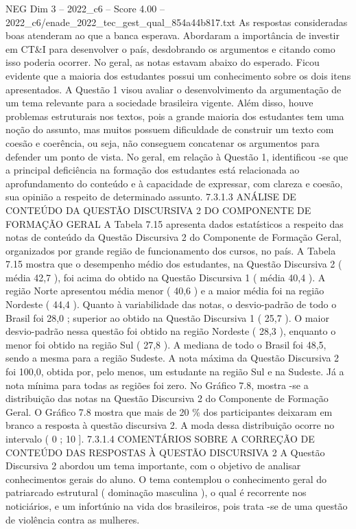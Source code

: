 \begin{textsample}{NEG Dim 3 – 2022\_c6 – Score 4.00 – 2022\_c6/enade\_2022\_tec\_gest\_qual\_854a44b817.txt}
As respostas consideradas boas atenderam ao que a banca esperava.
Abordaram a importância de investir em CT\&I para desenvolver o país, desdobrando os argumentos e citando como isso poderia ocorrer.
No geral, as notas estavam abaixo do esperado.
Ficou evidente que a maioria dos estudantes possui um conhecimento sobre os dois itens apresentados.
A Questão 1 visou avaliar o desenvolvimento da argumentação de um tema relevante para a sociedade brasileira vigente.
Além disso, houve problemas estruturais nos textos, pois a grande maioria dos estudantes tem uma noção do assunto, mas muitos possuem dificuldade de construir um texto com coesão e coerência, ou seja, não conseguem concatenar os argumentos para defender um ponto de vista.
No geral, em relação à Questão 1, identificou -se que a principal deficiência na formação dos estudantes está relacionada ao aprofundamento do conteúdo e à capacidade de expressar, com clareza e coesão, sua opinião a respeito de determinado assunto. 7.3.1.3 ANÁLISE DE CONTEÚDO DA QUESTÃO DISCURSIVA 2 DO COMPONENTE DE FORMAÇÃO GERAL A Tabela 7.15 apresenta dados estatísticos a respeito das notas de conteúdo da Questão Discursiva 2 do Componente de Formação Geral, organizados por grande região de funcionamento dos cursos, no país.
A Tabela 7.15 mostra que o desempenho médio dos estudantes, na Questão Discursiva 2 ( média 42,7 ), foi acima do obtido na Questão Discursiva 1 ( média 40,4 ).
A região Norte apresentou média menor ( 40,6 ) e a maior média foi na região Nordeste ( 44,4 ).
Quanto à variabilidade das notas, o desvio-padrão de todo o Brasil foi 28,0 ; superior ao obtido na Questão Discursiva 1 ( 25,7 ).
O maior desvio-padrão nessa questão foi obtido na região Nordeste ( 28,3 ), enquanto o menor foi obtido na região Sul ( 27,8 ).
A mediana de todo o Brasil foi 48,5, sendo a mesma para a região Sudeste.
A nota máxima da Questão Discursiva 2 foi 100,0, obtida por, pelo menos, um estudante na região Sul e na Sudeste.
Já a nota mínima para todas as regiões foi zero.
No Gráfico 7.8, mostra -se a distribuição das notas na Questão Discursiva 2 do Componente de Formação Geral.
O Gráfico 7.8 mostra que mais de 20 \% dos participantes deixaram em branco a resposta à questão discursiva 2.
A moda dessa distribuição ocorre no intervalo ( 0 ; 10 ]. 7.3.1.4 COMENTÁRIOS SOBRE A CORREÇÃO DE CONTEÚDO DAS RESPOSTAS À QUESTÃO DISCURSIVA 2 A Questão Discursiva 2 abordou um tema importante, com o objetivo de analisar conhecimentos gerais do aluno.
O tema contemplou o conhecimento geral do patriarcado estrutural ( dominação masculina ), o qual é recorrente nos noticiários, e um infortúnio na vida dos brasileiros, pois trata -se de uma questão de violência contra as mulheres.

\end{textsample}
